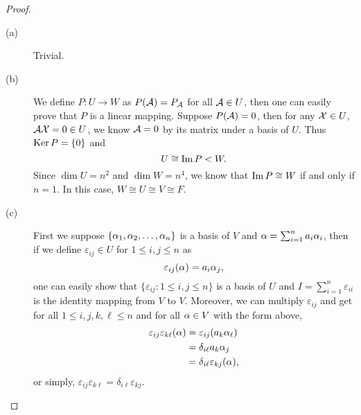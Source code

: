 \begin{proof}
	\begin{description}
	\item[(a)] Trivial.
	\item[(b)] We define $P\colon U\to W$ as $P(\mathcal{A})=P_{\mathcal{A}}$ for all $\mathcal{A}\in U$, then one can easily prove that $P$ is a linear mapping. Suppose $P(\mathcal{A})=0$, then for any $\mathcal{X}\in U$, $\mathcal{A}\mathcal{X}=0\in U$, we know $\mathcal{A}=0$ by its matrix under a basis of $U$. Thus $\operatorname*{Ker}{P}=\{0\}$ and 
	\[U\cong\operatorname*{Im}{P}<W.\]
	Since $\dim U=n^2$ and $\dim W=n^4$, we know that $\operatorname*{Im}{P}\cong W$ if and only if $n=1$. In this case, $W\cong U\cong V\cong F$.
	\item[(c)] First we suppose $\{\alpha_1,\alpha_2,\dots,\alpha_n\}$ is a basis of $V$ and $\alpha=\sum_{i=1}^n a_i \alpha_i$, then if we define
	$\varepsilon_{ij}\in U$ for $1\leq i,j\leq n$ as
	\[\varepsilon_{ij}(\alpha)=a_i \alpha_j,\]
	one can easily show that $\{\varepsilon_{ij}\colon 1\leq i,j\leq n\}$ is a basis of $U$ and $I=\sum_{i=1}^n \varepsilon_{ii}$ is the identity mapping from $V$ to $V$. Moreover, we can multiply $\varepsilon_{ij}$ and get for all $1\leq i,j,k,\ell\leq n$ and for all $\alpha\in V$ with the form above, 
	\begin{align*}
	\varepsilon_{ij}\varepsilon_{k\ell}(\alpha)&=\varepsilon_{ij}(a_k \alpha_{\ell})\\
							&=\delta_{i\ell} a_k \alpha_j\\
							&=\delta_{i\ell} \varepsilon_{kj}(\alpha),
	\end{align*}
	or simply, $\varepsilon_{ij}\varepsilon_{k\ell}=\delta_{i\ell} \varepsilon_{kj}$. 


\end{description}
\end{proof}
